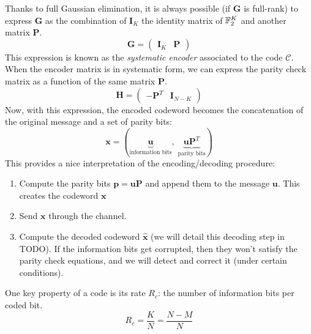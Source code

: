 Thanks to full Gaussian elimination, it is always possible (if $\bm{G}$ is
full-rank) to express $\bm{G}$ as the combination of $\bm{I}_K$ the identity
matrix of $\mathbb{F}_2^K$ and another matrix $\bm{P}$.
\begin{equation}
    \bm{G} =
    \begin{pmatrix}
        \bm{I}_K & \bm{P}
    \end{pmatrix}
\end{equation}
This expression is known as the \textit{systematic encoder} associated to the
code $\mathcal{C}$. When the encoder matrix is in systematic form, we
can express the parity check matrix as a function of the same matrix $\bm{P}$.
\begin{equation}
    \bm{H} =
    \begin{pmatrix}
        - \bm{P}^T & \bm{I}_{N-K}
    \end{pmatrix}
\end{equation}
Now, with this expression, the encoded codeword becomes the
concatenation of the original message and a set of parity bits:
\begin{equation}
    \bm{x} = (
    \underbrace{\bm{u}}_\text{information bits} ,\;
    \underbrace{\bm{u} \bm{P}^T}_\text{parity bits}
    )
\end{equation}
This provides a nice interpretation of the encoding/decoding procedure:
\begin{enumerate}
    \item Compute the parity bits $\bm{p} = \bm{u} \bm{P}$ and append them
          to the message $\bm{u}$. This creates the codeword $\bm{x}$
    \item Send $\bm{x}$ through the channel.
    \item Compute the decoded codeword $\widehat{\bm{x}}$ (we will detail this
          decoding step in TODO). If the information bits get corrupted, then
          they won't satisfy the parity check equations, and we will detect and
          correct it (under certain conditions).
\end{enumerate}

One key property of a code is its rate $R_c$: the number of information bits per
coded bit.
\begin{equation}
    R_c = \frac{K}{N} = \frac{N - M}{N}
\end{equation}


